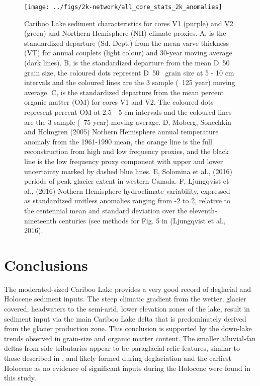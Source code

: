 \documentclass[Royal,times,doublespace,sageh]{sagej}
\begin{document}
\begin{figure}

{\centering \texttt{[image: ../figs/2k-network/all\_core\_stats\_2k\_anomalies]} 

}

\caption{Cariboo Lake sediment characteristics for cores V1 (purple) and V2 (green) and Northern Hemisphere (NH) climate proxies. A, is the standardized departure (Sd. Dept.) from the mean varve thickness (VT) for annual couplets (light colour) and 30-year moving average (dark lines). B, is the standardized departure from the mean D~50~ grain size, the coloured dots represent D~50~ grain size at 5 - 10 cm intervals and the coloured lines are the 3 sample (~125 year) moving average. C, is the standardized departure from the mean percent organic matter (OM) for cores V1 and V2. The coloured dots represent percent OM at 2.5 - 5 cm intervals and the coloured lines are the 3 sample (~75 year) moving average. D, Moberg, Sonechkin and Holmgren (2005) Nothern Hemisphere annual temperature anomaly from the 1961-1990 mean, the orange line is the full reconstruction from high and low frequency proxies, and the black line is the low frequency proxy component with upper and lower uncertainty marked by dashed blue lines. E, Solomina et al., (2016) periods of peak glacier extent in western Canada. F, Ljungqvist et al., (2016) Nothern Hemisphere hydroclimate variability, expressed as standardized unitless anomalies ranging from -2 to 2, relative to the centennial mean and standard deviation over the eleventh-nineteenth centuries (see methods for Fig. 5 in (Ljungqvist et al., 2016).\label{fig:proxy-comparison}}\label{fig:proxy-comparison}
\end{figure}

\hypertarget{conclusions}{%
\section{Conclusions}\label{conclusions}}

The moderated-sized Cariboo Lake provides a very good record of
deglacial and Holocene sediment inputs. The steep climatic gradient from
the wetter, glacier covered, headwaters to the semi-arid, lower
elevation zones of the lake, result in sediment input via the main
Cariboo Lake delta that is predominately derived from the glacier
production zone. This conclusion is supported by the down-lake trends
observed in grain-size and organic matter content. The smaller
alluvial-fan deltas from side tributaries appear to be paraglacial relic
features, similar to those described in \citet{Church1972}, and likely
formed during deglaciation and the earliest Holocene as no evidence of
significant inputs during the Holocene were found in this study.
\end{document}

